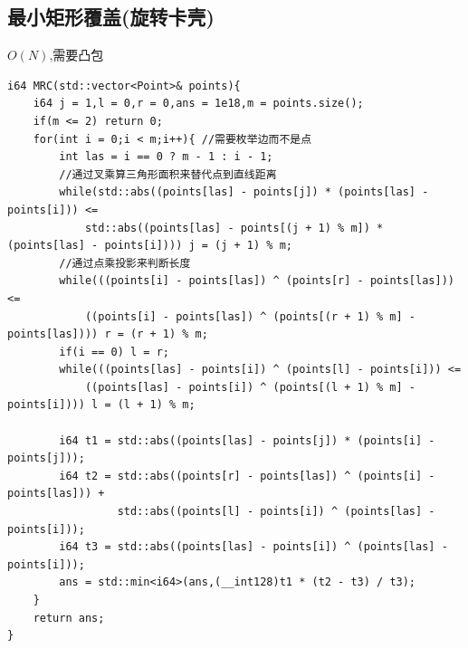 \subsection{最小矩形覆盖(旋转卡壳)}
$O(N)$,需要凸包
\begin{lstlisting}[caption={}]
i64 MRC(std::vector<Point>& points){
	i64 j = 1,l = 0,r = 0,ans = 1e18,m = points.size();
	if(m <= 2) return 0;
	for(int i = 0;i < m;i++){ //需要枚举边而不是点
		int las = i == 0 ? m - 1 : i - 1;
		//通过叉乘算三角形面积来替代点到直线距离
		while(std::abs((points[las] - points[j]) * (points[las] - points[i])) <=
			std::abs((points[las] - points[(j + 1) % m]) * (points[las] - points[i]))) j = (j + 1) % m;
		//通过点乘投影来判断长度
		while(((points[i] - points[las]) ^ (points[r] - points[las])) <=
			((points[i] - points[las]) ^ (points[(r + 1) % m] - points[las]))) r = (r + 1) % m;
		if(i == 0) l = r;
		while(((points[las] - points[i]) ^ (points[l] - points[i])) <=
			((points[las] - points[i]) ^ (points[(l + 1) % m] - points[i]))) l = (l + 1) % m;

		i64 t1 = std::abs((points[las] - points[j]) * (points[i] - points[j]));
		i64 t2 = std::abs((points[r] - points[las]) ^ (points[i] - points[las])) + 
				 std::abs((points[l] - points[i]) ^ (points[las] - points[i]));
		i64 t3 = std::abs((points[las] - points[i]) ^ (points[las] - points[i]));
		ans = std::min<i64>(ans,(__int128)t1 * (t2 - t3) / t3);
	}
	return ans;
}
\end{lstlisting}

